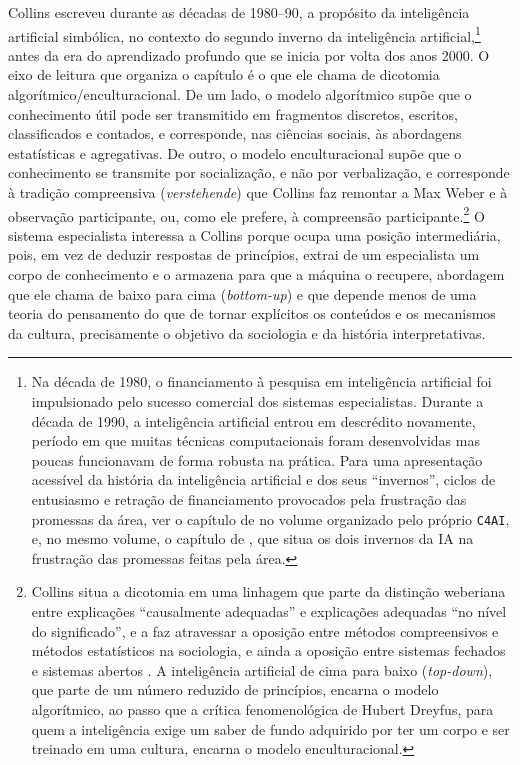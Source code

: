 Collins escreveu durante as décadas de 1980--90, a propósito da inteligência artificial simbólica, no contexto do segundo inverno da inteligência artificial,\footnote{Na década de 1980, o financiamento à pesquisa em inteligência artificial foi impulsionado pelo sucesso comercial dos sistemas especialistas. Durante a década de 1990, a inteligência artificial entrou em descrédito novamente, período em que muitas técnicas computacionais foram desenvolvidas mas poucas funcionavam de forma robusta na prática. Para uma apresentação acessível da história da inteligência artificial e dos seus \enquote{invernos}, ciclos de entusiasmo e retração de financiamento provocados pela frustração das promessas da área, ver o capítulo de \textcite[p.~23]{Cozman2021IA} no volume organizado pelo próprio \texttt{C4AI}, e, no mesmo volume, o capítulo de \textcite[p.~99]{Finger2021}, que situa os dois invernos da IA na frustração das promessas feitas pela área.} antes da era do aprendizado profundo que se inicia por volta dos anos 2000. O eixo de leitura que organiza o capítulo é o que ele chama de dicotomia algorítmico/enculturacional. De um lado, o modelo algorítmico supõe que o conhecimento útil pode ser transmitido em fragmentos discretos, escritos, classificados e contados, e corresponde, nas ciências sociais, às abordagens estatísticas e agregativas. De outro, o modelo enculturacional supõe que o conhecimento se transmite por socialização, e não por verbalização, e corresponde à tradição compreensiva (\textit{verstehende}) que Collins faz remontar a Max Weber e à observação participante, ou, como ele prefere, à compreensão participante.\footnote{Collins situa a dicotomia em uma linhagem que parte da distinção weberiana entre explicações \enquote{causalmente adequadas} e explicações adequadas \enquote{no nível do significado}, e a faz atravessar a oposição entre métodos compreensivos e métodos estatísticos na sociologia, e ainda a oposição entre sistemas fechados e sistemas abertos \parencite[pp.~322--323]{Collins2012Expert}. A inteligência artificial de cima para baixo (\textit{top-down}), que parte de um número reduzido de princípios, encarna o modelo algorítmico, ao passo que a crítica fenomenológica de Hubert Dreyfus, para quem a inteligência exige um saber de fundo adquirido por ter um corpo e ser treinado em uma cultura, encarna o modelo enculturacional.} O sistema especialista interessa a Collins porque ocupa uma posição intermediária, pois, em vez de deduzir respostas de princípios, extrai de um especialista um corpo de conhecimento e o armazena para que a máquina o recupere, abordagem que ele chama de baixo para cima (\textit{bottom-up}) e que depende menos de uma teoria do pensamento do que de tornar explícitos os conteúdos e os mecanismos da cultura, precisamente o objetivo da sociologia e da história interpretativas.

